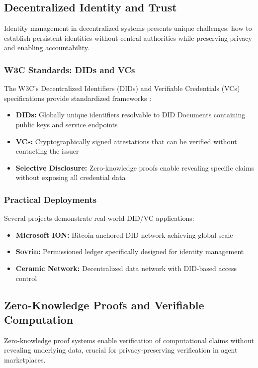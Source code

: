 \subsection{Decentralized Identity and Trust}

Identity management in decentralized systems presents unique challenges: how to establish persistent identities without central authorities while preserving privacy and enabling accountability.

\subsubsection{W3C Standards: DIDs and VCs}
The W3C's Decentralized Identifiers (DIDs) and Verifiable Credentials (VCs) specifications provide standardized frameworks \citep{w3c-did-v1,w3c-vc-2}:
\begin{itemize}
    \item \textbf{DIDs:} Globally unique identifiers resolvable to DID Documents containing public keys and service endpoints
    \item \textbf{VCs:} Cryptographically signed attestations that can be verified without contacting the issuer
    \item \textbf{Selective Disclosure:} Zero-knowledge proofs enable revealing specific claims without exposing all credential data
\end{itemize}

\subsubsection{Practical Deployments}
Several projects demonstrate real-world DID/VC applications:
\begin{itemize}
    \item \textbf{Microsoft ION:} Bitcoin-anchored DID network achieving global scale
    \item \textbf{Sovrin:} Permissioned ledger specifically designed for identity management
    \item \textbf{Ceramic Network:} Decentralized data network with DID-based access control
\end{itemize}

\subsection{Zero-Knowledge Proofs and Verifiable Computation}

Zero-knowledge proof systems enable verification of computational claims without revealing underlying data, crucial for privacy-preserving verification in agent marketplaces.

